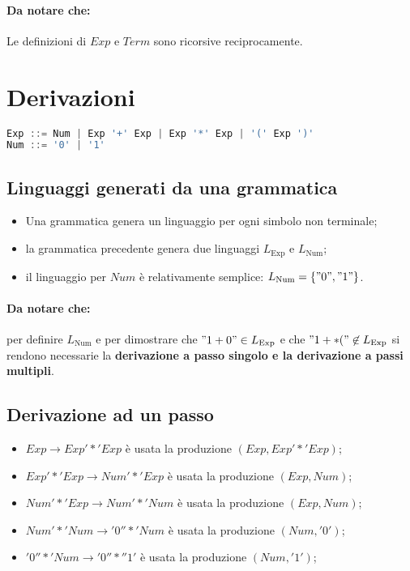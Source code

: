 \paragraph{Da notare che:}
Le definizioni di $Exp$ e $Term$ sono ricorsive reciprocamente.

\section{Derivazioni}
\begin{lstlisting}[language=Java, caption={Esempio}]
Exp ::= Num | Exp '+' Exp | Exp '*' Exp | '(' Exp ')'
Num ::= '0' | '1'
\end{lstlisting}

\subsection{Linguaggi generati da una grammatica}
\begin{itemize}
  \item Una grammatica genera un linguaggio per ogni simbolo non terminale;
  \item la grammatica precedente genera due linguaggi $L_{\text{Exp}}$ e
    $L_{\text{Num}}$;
  \item il linguaggio per $Num$ è relativamente semplice: $L_{\text{Num}}=
    \{"0","1"\}$.
\end{itemize}

\paragraph{Da notare che:}
per definire $L_{\text{Num}}$ e per dimostrare che $"1+0"\in L_{\text{Exp}}$ e
che $"1+*("\not\in L_{\text{Exp}}$ si rendono necessarie la \textbf{derivazione
a passo singolo e la derivazione a passi multipli}.

\subsection{Derivazione ad un passo}
\begin{itemize}
  \item $Exp\rightarrow Exp'*'Exp$ è usata la produzione $(Exp,Exp '*'Exp)$;
  \item $Exp'*'Exp\rightarrow Num'*'Exp$ è usata la produzione $(Exp,Num)$;
  \item $Num'*'Exp\rightarrow Num'*'Num$ è usata la produzione $(Exp,Num)$;
  \item $Num'*'Num\rightarrow '0''*'Num$ è usata la produzione $(Num,'0')$;
  \item $'0''*'Num\rightarrow '0''*''1'$ è usata la produzione $(Num,'1')$;
\end{itemize}

